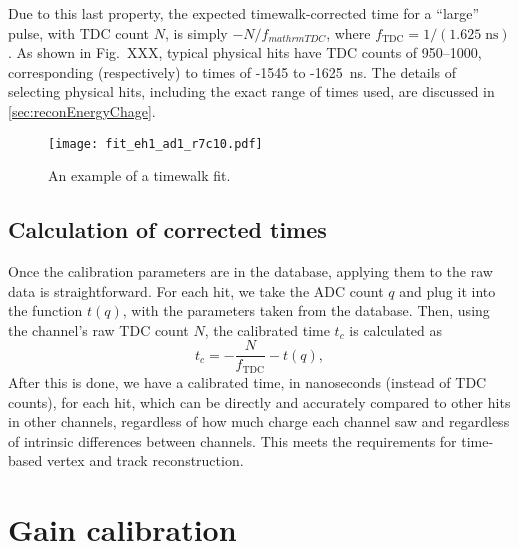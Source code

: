 \documentclass[../thesis.tex]{subfiles}
\begin{document}
Due to this last property, the expected timewalk-corrected time for a ``large''
pulse, with TDC count $N$, is simply $-N/f_{mathrm{TDC}}$, where
$f_{\mathrm{TDC}} = 1/(1.625\;\text{ns})$. As shown in Fig.~XXX, typical
physical hits have TDC counts of 950--1000, corresponding (respectively) to
times of -1545 to -1625~ns. The details of selecting physical hits, including
the exact range of times used, are discussed in \autoref{sec:reconEnergyChage}.


\begin{figure}
  \texttt{[image: fit\_eh1\_ad1\_r7c10.pdf]}
  \caption{An example of a timewalk fit.}
  \label{fig:timewalk}
\end{figure}

\begin{comment}
  Show the tof-corrected times; comment on TDC discretization.
\end{comment}

\subsection{Calculation of corrected times}

Once the calibration parameters are in the database, applying them to the raw
data is straightforward. For each hit, we take the ADC count $q$ and plug it
into the function $t(q)$, with the parameters taken from the database. Then,
using the channel's raw TDC count $N$, the calibrated time $t_c$ is calculated
as
\begin{equation}
  \label{eq:corrTime}
  t_c = -\frac{N}{f_\mathrm{TDC}} - t(q),
\end{equation}
After this is done, we have a calibrated time, in nanoseconds (instead of TDC
counts), for each hit, which can be directly and accurately compared to other
hits in other channels, regardless of how much charge each channel saw and
regardless of intrinsic differences between channels. This meets the
requirements for time-based vertex and track reconstruction.

\section{Gain calibration}
\end{document}
